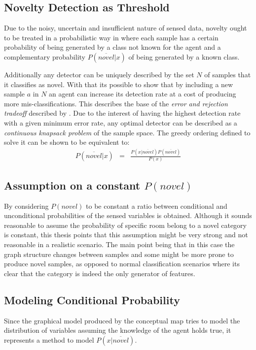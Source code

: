 \documentclass[9pt,a4paper]{extarticle}
\begin{document}
\begin{multicols}{2}
\subsection{Novelty Detection as Threshold}
Due to the noisy, uncertain and insufficient nature of sensed data, novelty ought to be
treated in a probabilistic way in where each sample has a certain probability
of being generated by a class not known for the agent and a complementary probability $P(\overline{novel}|x)$
of being generated by a known class.

Additionally any detector can be uniquely described by the set $N$ of samples that it
classifies as novel. With that its possible to show that by including a new sample $a$ in $N$ an agent
can increase its detection rate at a cost of producing more mis-classifications.
This describes the base of the \emph{error and rejection tradeoff} described by \cite{chow1970optimum}.
Due to the interest of having the highest detection rate with a given minimum error rate, any optimal
detector can be described as a \emph{continuous knapsack problem} of the sample space.
The greedy ordering defined to solve it can be shown to be equivalent to:
\begin{eqnarray}
P(\overline{novel}|x) &=& \frac{P(x|\overline{novel})P(\overline{novel})}{P(x)}
\end{eqnarray}

\subsection{Assumption on a constant $P(novel)$}
By considering $P(novel)$ to be constant a ratio between conditional and unconditional probabilities
of the sensed variables is obtained.
Although it sounds reasonable to assume the probability of specific room belong to a novel
category is constant, this thesis points that this assumption might be very strong and not
reasonable in a realistic scenario. The main point being that in this case the graph structure
changes between samples and some might be more prone to produce novel samples, as opposed to normal
classification scenarios where its clear that the category is indeed the only generator of features.

\subsection{Modeling Conditional Probability}
Since the graphical model produced by the conceptual map tries to model the distribution of
variables assuming the knowledge of the agent holds true, it represents a method to model
$P(x|\overline{novel})$.


\end{multicols}
\end{document}
